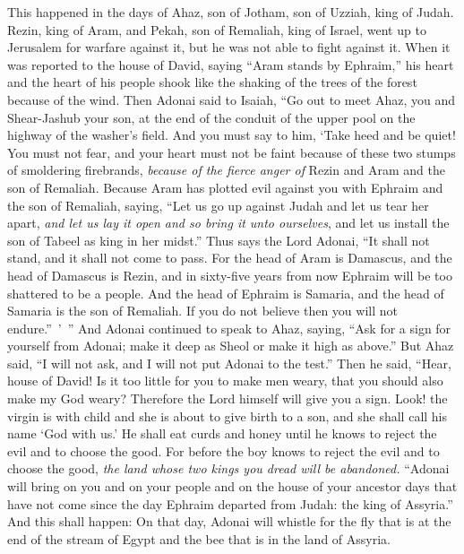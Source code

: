 \begin{biblechapter} %
 This happened in the days of Ahaz, son of Jotham, son of Uzziah, king of Judah. Rezin, king of Aram, and Pekah, son of Remaliah, king of Israel, went up to Jerusalem for warfare against it, but he was not able to fight against it.
\verse When it was reported to the house of David, saying “Aram stands by Ephraim,” his heart and the heart of his people shook like the shaking of the trees of the forest because of the wind.
\verse Then Adonai said to Isaiah, “Go out to meet Ahaz, you and Shear-Jashub your son, at the end of the conduit of the upper pool on the highway of the washer’s field.
\verse And you must say to him, ‘Take heed and be quiet! You must not fear, and your heart must not be faint because of these two stumps of smoldering firebrands, \textit{because of the fierce anger of} Rezin and Aram and the son of Remaliah.
\verse Because Aram has plotted evil against you with Ephraim and the son of Remaliah, saying,
\verse “Let us go up against Judah and let us tear her apart, \textit{and let us lay it open and so bring it unto ourselves}, and let us install the son of Tabeel as king in her midst.”
\verse Thus says the Lord Adonai, “It shall not stand, and it shall not come to pass.
\verse For the head of Aram is Damascus, and the head of Damascus is Rezin, and in sixty-five years from now Ephraim will be too shattered to be a people.
\verse And the head of Ephraim is Samaria, and the head of Samaria is the son of Remaliah. If you do not believe then you will not endure.” ’ ”
\verse And Adonai continued to speak to Ahaz, saying,
\verse “Ask for a sign for yourself from Adonai; make it deep as Sheol or make it high as above.”
\verse But Ahaz said, “I will not ask, and I will not put Adonai to the test.”
\verse Then he said, “Hear, house of David! Is it too little for you to make men weary, that you should also make my God weary?
\verse Therefore the Lord himself will give you a sign. Look! the virgin is with child and she is about to give birth to a son, and she shall call his name ‘God with us.’
\verse He shall eat curds and honey until he knows to reject the evil and to choose the good.
\verse For before the boy knows to reject the evil and to choose the good, \textit{the land whose two kings you dread will be abandoned.}
 “Adonai will bring on you and on your people and on the house of your ancestor days that have not come since the day Ephraim departed from Judah: the king of Assyria.”
\verse And this shall happen: On that day, Adonai will whistle for the fly that is at the end of the stream of Egypt and the bee that is in the land of Assyria.

\end{biblechapter}
